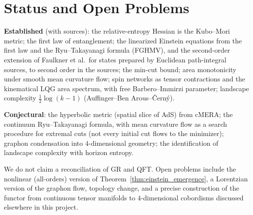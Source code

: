 \documentclass[11pt,a4paper,reqno]{amsart}
\theoremstyle{definition}
\numberwithin{equation}{section}
\begin{document}
\section{Status and Open Problems}
\label{sec:status}

\textbf{Established} (with sources): the relative-entropy Hessian is the Kubo--Mori metric; the first law of entanglement; the linearized Einstein equations from the first law and the Ryu--Takayanagi formula (FGHMV), and the second-order extension of Faulkner et al.\ for states prepared by Euclidean path-integral sources, to second order in the sources; the min-cut bound; area monotonicity under smooth mean curvature flow; spin networks as tensor contractions and the kinematical LQG area spectrum, with free Barbero--Immirzi parameter; landscape complexity $\frac12\log(k-1)$ (Auffinger--Ben Arous--\v{C}ern\'y).

\textbf{Conjectural}: the hyperbolic metric (spatial slice of AdS) from cMERA; the continuum Ryu--Takayanagi formula, with mean curvature flow as a search procedure for extremal cuts (not every initial cut flows to the minimizer); graphon condensation into $4$-dimensional geometry; the identification of landscape complexity with horizon entropy.

We do not claim a reconciliation of GR and QFT. Open problems include the nonlinear (all-orders) version of Theorem~\ref{thm:einstein_emergence}, a Lorentzian version of the graphon flow, topology change, and a precise construction of the functor from continuous tensor manifolds to $4$-dimensional cobordisms discussed elsewhere in this project.


\end{document}
